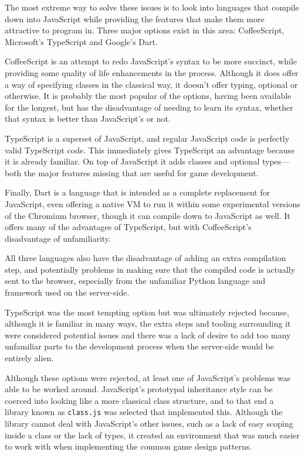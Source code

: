 The most extreme way to solve these issues is to look into languages that compile down into JavaScript while providing the features that make them more attractive to program in. Three major options exist in this area: CoffeeScript, Microsoft's TypeScript and Google's Dart.

CoffeeScript is an attempt to redo JavaScript's syntax to be more succinct, while providing some quality of life enhancements in the process. Although it does offer a way of specifying classes in the classical way, it doesn't offer typing, optional or otherwise. It is probably the most popular of the options, having been available for the longest, but has the disadvantage of needing to learn its syntax, whether that syntax is better than JavaScript's or not.

TypeScript is a superset of JavaScript, and regular JavaScript code is perfectly valid TypeScript code. This immediately gives TypeScript an advantage because it is already familiar. On top of JavaScript it adds classes and optional types---both the major features missing that are useful for game development.

Finally, Dart is a language that is intended as a complete replacement for JavaScript, even offering a native VM to run it within some experimental versions of the Chromium browser, though it can compile down to JavaScript as well. It offers many of the advantages of TypeScript, but with CoffeeScript's disadvantage of unfamiliarity.

All three languages also have the disadvantage of adding an extra compilation step, and potentially problems in making sure that the compiled code is actually sent to the browser, especially from the unfamiliar Python language and framework used on the server-side.

TypeScript was the most tempting option but was ultimately rejected because, although it is familiar in many ways, the extra steps and tooling surrounding it were considered potential issues and there was a lack of desire to add too many unfamiliar parts to the development process when the server-side would be entirely alien.

Although these options were rejected, at least one of JavaScript's problems was able to be worked around. JavaScript's prototypal inheritance style can be coerced into looking like a more classical class structure, and to that end a library known as \texttt{class.js} \cite{citeulike:13160361} was selected that implemented this. Although the library cannot deal with JavaScript's other issues, such as a lack of easy scoping inside a class or the lack of types, it created an environment that was much easier to work with when implementing the common game design patterns.

